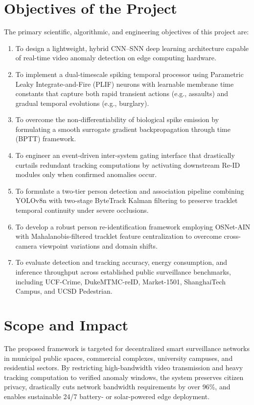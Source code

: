 \documentclass[12pt,a4paper]{report}
\begin{document}
\section{Objectives of the Project}
The primary scientific, algorithmic, and engineering objectives of this project are:
\begin{enumerate}
    \item To design a lightweight, hybrid CNN--SNN deep learning architecture capable of real-time video anomaly detection on edge computing hardware.
    \item To implement a dual-timescale spiking temporal processor using Parametric Leaky Integrate-and-Fire (PLIF) neurons with learnable membrane time constants that capture both rapid transient actions (e.g., assaults) and gradual temporal evolutions (e.g., burglary).
    \item To overcome the non-differentiability of biological spike emission by formulating a smooth surrogate gradient backpropagation through time (BPTT) framework.
    \item To engineer an event-driven inter-system gating interface that drastically curtails redundant tracking computations by activating downstream Re-ID modules only when confirmed anomalies occur.
    \item To formulate a two-tier person detection and association pipeline combining YOLOv8n with two-stage ByteTrack Kalman filtering to preserve tracklet temporal continuity under severe occlusions.
    \item To develop a robust person re-identification framework employing OSNet-AIN with Mahalanobis-filtered tracklet feature centralization to overcome cross-camera viewpoint variations and domain shifts.
    \item To evaluate detection and tracking accuracy, energy consumption, and inference throughput across established public surveillance benchmarks, including UCF-Crime, DukeMTMC-reID, Market-1501, ShanghaiTech Campus, and UCSD Pedestrian.
\end{enumerate}

\section{Scope and Impact}
The proposed framework is targeted for decentralized smart surveillance networks in municipal public spaces, commercial complexes, university campuses, and residential sectors. By restricting high-bandwidth video transmission and heavy tracking computation to verified anomaly windows, the system preserves citizen privacy, drastically cuts network bandwidth requirements by over 96\%, and enables sustainable 24/7 battery- or solar-powered edge deployment.
\end{document}
